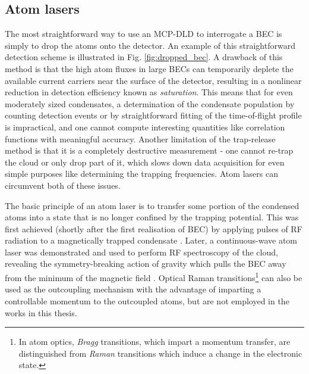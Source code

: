 \subsection*{Atom lasers}
	\label{sec:atomlaser}



	The most straightforward way to use an MCP-DLD to interrogate a BEC is simply to drop the atoms onto the detector.
	An example of this straightforward detection scheme is illustrated in Fig.
	\ref{fig:dropped_bec}.
	A drawback of this method is that the high atom fluxes in large BECs can temporarily deplete the available current carriers near the surface of the detector, resulting in a nonlinear reduction in detection efficiency known as \emph{saturation}.
	This means that for even moderately sized condensates, a determination of the condensate population by counting detection events or by straightforward fitting of the time-of-flight profile is impractical, and one cannot compute interesting quantities like correlation functions with meaningful accuracy.
	Another limitation of the trap-release method is that it is a completely destructive measurement - one cannot re-trap the cloud or only drop part of it, which slows down data acquisition for even simple purposes like determining the trapping frequencies.
	Atom lasers can circumvent both of these issues.
	

	The basic principle of an atom laser is to transfer some portion of the condensed atoms into a state that is no longer confined by the trapping potential.
	This was first achieved (shortly after the first realisation of BEC) by applying pulses of RF radiation to a magnetically trapped condensate \cite{Mewes97}.
	Later, a continuous-wave atom laser was demonstrated and used to perform RF spectroscopy of the cloud, revealing the symmetry-breaking action of gravity which pulls the BEC away from the minimum of the magnetic field \cite{Bloch99}.
	Optical Raman transitions\footnote{In atom optics, \emph{Bragg} transitions, which impart a momentum transfer, are distinguished from  \emph{Raman} transitions which induce a change in the electronic state.} can also be used as the outcoupling mechanism \cite{Hagley99} with the advantage of imparting a controllable momentum to the outcoupled atoms, but are not employed in the works in this thesis.
	

